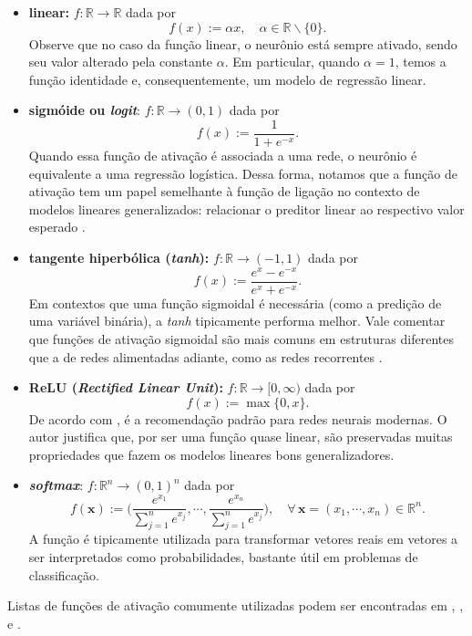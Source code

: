 \documentclass{automatextcc}
\newcommand{\R}{\mathds{R}}
\newcommand{\bs}[1]{\boldsymbol{#1}}
\begin{document}
\begin{itemize}
    \item \textbf{linear:} $f: \R \rightarrow \R$ dada por 
    \[f(x) := \alpha x, \quad \alpha \in \R\backslash\{0\}.\]
    Observe que no caso da função linear, o neurônio está sempre ativado, sendo seu valor alterado pela constante $\alpha$. Em particular, quando $\alpha=1$, temos a função identidade e, consequentemente, um modelo de regressão linear.
    \item \textbf{sigmóide ou \textit{logit}}: $f: \R \rightarrow (0,1)$ dada por 
    \[f(x) := \frac{1}{1 + e^{-x}}.\]
    Quando essa função de ativação é associada a uma rede, o neurônio é equivalente a uma regressão logística. Dessa forma, notamos que a função de ativação tem um papel semelhante à função de ligação no contexto de modelos lineares generalizados: relacionar o preditor linear ao respectivo valor esperado \citep{sarle1994,frei2020,mccullagh1989}.
    \item \textbf{tangente hiperbólica (\textit{tanh}):}  $f:\R \rightarrow (-1,1)$ dada por 
    \[f(x) := \frac{e^{x}-e^{-x}}{e^{x}+e^{-x}}.\]
    Em contextos que uma função sigmoidal é necessária (como a predição de uma variável binária), a \textit{tanh} tipicamente performa melhor. Vale comentar que funções de ativação sigmoidal são mais comuns em estruturas diferentes que a de redes alimentadas adiante, como as redes recorrentes \citep{goodfellow2016}.  
    \item \textbf{ReLU (\textit{Rectified Linear Unit}):} $f: \R \rightarrow [0,\infty)$ dada por 
    \[f(x) := \max\{0,x\}.\]
    De acordo com \citet{goodfellow2016}, é a recomendação padrão para redes neurais modernas. O autor justifica que, por ser uma função quase linear, são preservadas muitas propriedades que fazem os modelos lineares bons generalizadores. 
    \item \textbf{\textit{softmax}}: $f:\R^n\rightarrow (0,1)^n$ dada por 
    \[f(\bs x):=\bigg(\frac{e^{x_1}}{\sum_{j=1}^n e^{x_j}},\cdots, \frac{e^{x_n}}{\sum_{j=1}^n e^{x_j}}\bigg), \quad \forall\,\bs x=(x_1,\cdots,x_n)\in\R^n.\]
    {A função} é tipicamente utilizada para transformar vetores reais em vetores a ser interpretados como probabilidades, bastante útil em problemas de classificação.
\end{itemize}
Listas de funções de ativação comumente utilizadas podem ser encontradas em \citet{hastie2008}, \citet{hagan2014}, \citet{aggarwal2018} e \citet{dsa2022}.
\end{document}
